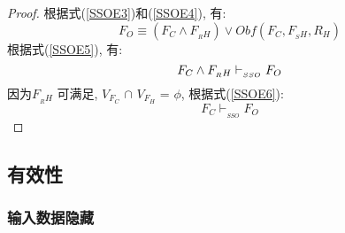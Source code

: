 \begin{proof}
根据式(\ref{SSOE3})和(\ref{SSOE4}), 有:\\
        \begin{equation}\label{SSOE5}
	  F_O \equiv (F_C\wedge F_{_RH}) \vee Obf(F_C,F_{_SH},R_H)
	\end{equation}
根据式(\ref{SSOE5}), 有:\\
	 \begin{equation}\label{SSOE6}
	  F_C \wedge F_{_RH}\vdash_{_{SSO}} F_{O} \\
	\end{equation}
因为$F_{_RH}$ 可满足, $V_{F_C}$ $\cap$ $V_{F_H}$ = $\phi$, 根据式(\ref{SSOE6}):\\	
	 \begin{equation}\label{SSOEND}
          F_C \vdash_{_{SSO}} F_O
         \end{equation}
\end{proof}
\subsection{有效性}
\subsubsection{输入数据隐藏}

